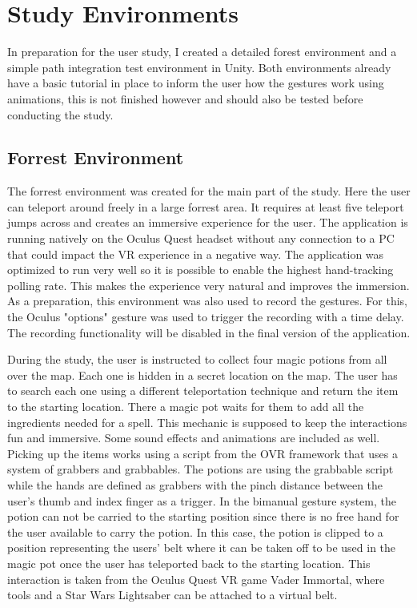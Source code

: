 
\chapter{Study Environments}
In preparation for the user study, I created a detailed forest environment and a simple path integration test environment in Unity. Both environments already have a basic tutorial in place to inform the user how the gestures work using animations, this is not finished however and should also be tested before conducting the study.


\section{Forrest Environment}
The forrest environment was created for the main part of the study. Here the user can teleport around freely in a large forrest area. It requires at least five teleport jumps across and creates an immersive experience for the user. The application is running natively on the Oculus Quest headset without any connection to a PC that could impact the VR experience in a negative way. The application was optimized to run very well so it is possible to enable the highest hand-tracking polling rate. This makes the experience very natural and improves the immersion. As a preparation, this environment was also used to record the gestures. For this, the Oculus "options" gesture was used to trigger the recording with a time delay. The recording functionality will be disabled in the final version of the application. %

During the study, the user is instructed to collect four magic potions from all over the map. Each one is hidden in a secret location on the map. The user has to search each one using a different teleportation technique and return the item to the starting location. There a magic pot waits for them to add all the ingredients needed for a spell. This mechanic is supposed to keep the interactions fun and immersive. Some sound effects and animations are included as well. Picking up the items works using a script from the OVR framework that uses a system of grabbers and grabbables. The potions are using the grabbable script while the hands are defined as grabbers with the pinch distance between the user's thumb and index finger as a trigger. In the bimanual gesture system, the potion can not be carried to the starting position since there is no free hand for the user available to carry the potion. In this case, the potion is clipped to a position representing the users' belt where it can be taken off to be used in the magic pot once the user has teleported back to the starting location. This interaction is taken from the Oculus Quest VR game Vader Immortal, where tools and a Star Wars Lightsaber can be attached to a virtual belt. 


